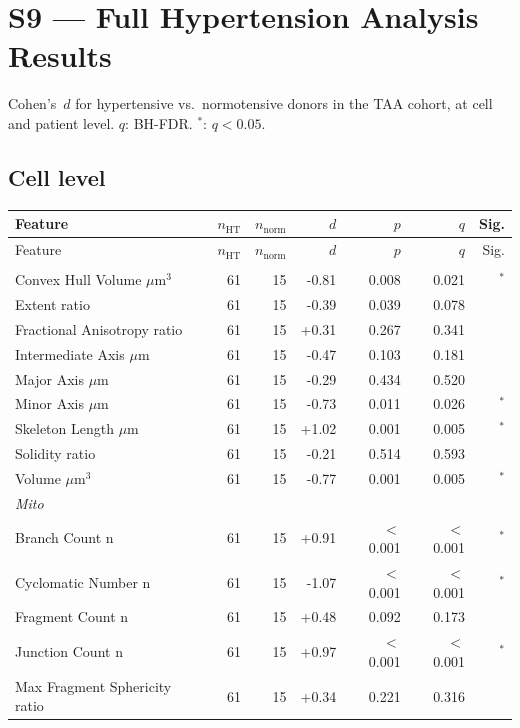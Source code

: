 \documentclass[11pt,a4paper]{article}
\begin{document}
\section*{S9 — Full Hypertension Analysis Results}
Cohen's~$d$ for hypertensive vs.\ normotensive donors in the TAA cohort,
at cell and patient level. $q$: BH-FDR. $^{*}$: $q<0.05$.
\vspace{1em}
\subsection*{Cell level}
\begin{longtable}{lrrrrrr}
\toprule
Feature & $n_\text{HT}$ & $n_\text{norm}$ & $d$ & $p$ & $q$ & Sig. \\
\midrule\endfirsthead
\toprule Feature & $n_\text{HT}$ & $n_\text{norm}$ & $d$ & $p$ & $q$ & Sig. \\\midrule\endhead
\bottomrule\endfoot
\multicolumn{7}{l}{\textit{Actin}} \\
  Convex Hull Volume $\mu$m$^{3}$ & 61 & 15 & -0.81 & 0.008 & 0.021 & $^{*}$ \\
  Extent ratio & 61 & 15 & -0.39 & 0.039 & 0.078 &  \\
  Fractional Anisotropy ratio & 61 & 15 & +0.31 & 0.267 & 0.341 &  \\
  Intermediate Axis $\mu$m & 61 & 15 & -0.47 & 0.103 & 0.181 &  \\
  Major Axis $\mu$m & 61 & 15 & -0.29 & 0.434 & 0.520 &  \\
  Minor Axis $\mu$m & 61 & 15 & -0.73 & 0.011 & 0.026 & $^{*}$ \\
  Skeleton Length $\mu$m & 61 & 15 & +1.02 & 0.001 & 0.005 & $^{*}$ \\
  Solidity ratio & 61 & 15 & -0.21 & 0.514 & 0.593 &  \\
  Volume $\mu$m$^{3}$ & 61 & 15 & -0.77 & 0.001 & 0.005 & $^{*}$ \\
\midrule
\multicolumn{7}{l}{\textit{Mito}} \\
  Branch Count n & 61 & 15 & +0.91 & $<$0.001 & $<$0.001 & $^{*}$ \\
  Cyclomatic Number n & 61 & 15 & -1.07 & $<$0.001 & $<$0.001 & $^{*}$ \\
  Fragment Count n & 61 & 15 & +0.48 & 0.092 & 0.173 &  \\
  Junction Count n & 61 & 15 & +0.97 & $<$0.001 & $<$0.001 & $^{*}$ \\
  Max Fragment Sphericity ratio & 61 & 15 & +0.34 & 0.221 & 0.316 &  \\

\end{longtable}
\end{document}
